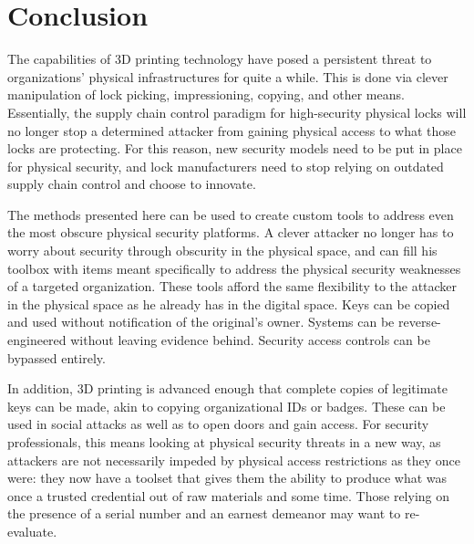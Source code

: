 \documentclass{acm_proc_article-sp}
\begin{document}
\section{Conclusion}
The capabilities of 3D printing technology have posed a persistent threat to organizations' physical infrastructures for quite a while. This is done via clever manipulation of lock picking, impressioning, copying, and other means. Essentially, the supply chain control paradigm for high-security physical locks will no longer stop a determined attacker from gaining physical access to what those locks are protecting. For this reason, new security models need to be put in place for physical security, and lock manufacturers need to stop relying on outdated supply chain control and choose to innovate.

The methods presented here can be used to create custom tools to address even the most obscure physical security platforms. A clever attacker no longer has to worry about security through obscurity in the physical space, and can fill his toolbox with items meant specifically to address the physical security weaknesses of a targeted organization. These tools afford the same flexibility to the attacker in the physical space as he already has in the digital space. Keys can be copied and used without notification of the original's owner. Systems can be reverse-engineered without leaving evidence behind. Security access controls can be bypassed entirely.

In addition, 3D printing is advanced enough that complete copies of legitimate keys can be made, akin to copying organizational IDs or badges. These can be used in social attacks as well as to open doors and gain access. For security professionals, this means looking at physical security threats in a new way, as attackers are not necessarily impeded by physical access restrictions as they once were: they now have a toolset that gives them the ability to produce what was once a trusted credential out of raw materials and some time. Those relying on the presence of a serial number and an earnest demeanor may want to re-evaluate.



\nocite{*}
\balancecolumns
\end{document}
